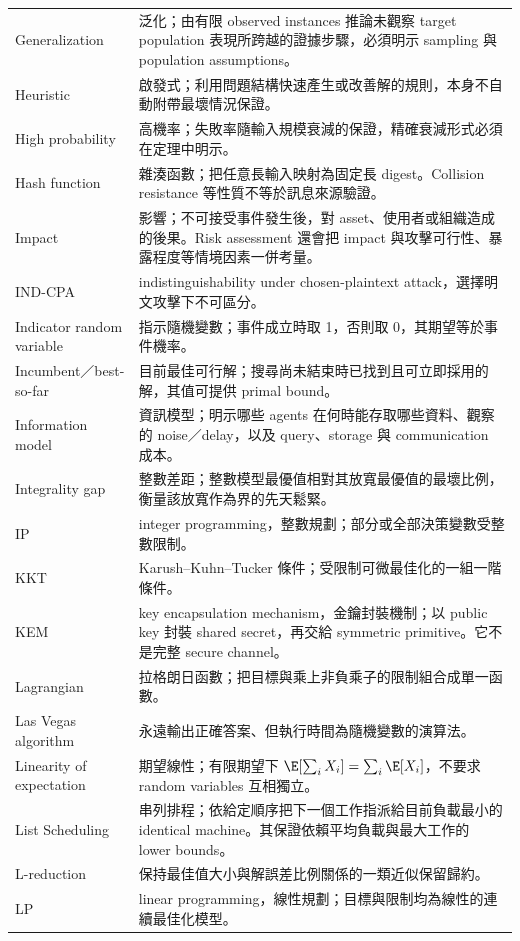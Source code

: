 \documentclass[11pt,a4paper,oneside,openany]{book}
\begin{document}
\begin{longtable}{@{}>{\raggedright\arraybackslash}p{}p{}@{}}
Generalization & 泛化；由有限 observed instances 推論未觀察 target population 表現所跨越的證據步驟，必須明示 sampling 與 population assumptions。 \\
Heuristic & 啟發式；利用問題結構快速產生或改善解的規則，本身不自動附帶最壞情況保證。 \\
High probability & 高機率；失敗率隨輸入規模衰減的保證，精確衰減形式必須在定理中明示。 \\
Hash function & 雜湊函數；把任意長輸入映射為固定長 digest。Collision resistance 等性質不等於訊息來源驗證。 \\
Impact & 影響；不可接受事件發生後，對 asset、使用者或組織造成的後果。Risk assessment 還會把 impact 與攻擊可行性、暴露程度等情境因素一併考量。 \\
IND-CPA & indistinguishability under chosen-plaintext attack，選擇明文攻擊下不可區分。 \\
Indicator random variable & 指示隨機變數；事件成立時取 1，否則取 0，其期望等於事件機率。 \\
Incumbent／best-so-far & 目前最佳可行解；搜尋尚未結束時已找到且可立即採用的解，其值可提供 primal bound。 \\
Information model & 資訊模型；明示哪些 agents 在何時能存取哪些資料、觀察的 noise／delay，以及 query、storage 與 communication 成本。 \\
Integrality gap & 整數差距；整數模型最優值相對其放寬最優值的最壞比例，衡量該放寬作為界的先天鬆緊。 \\
IP & integer programming，整數規劃；部分或全部決策變數受整數限制。 \\
KKT & Karush--Kuhn--Tucker 條件；受限制可微最佳化的一組一階條件。 \\
KEM & key encapsulation mechanism，金鑰封裝機制；以 public key 封裝 shared secret，再交給 symmetric primitive。它不是完整 secure channel。 \\
Lagrangian & 拉格朗日函數；把目標與乘上非負乘子的限制組合成單一函數。 \\
Las Vegas algorithm & 永遠輸出正確答案、但執行時間為隨機變數的演算法。 \\
Linearity of expectation & 期望線性；有限期望下 $\E[\sum_iX_i]=\sum_i\E[X_i]$，不要求 random variables 互相獨立。 \\
List Scheduling & 串列排程；依給定順序把下一個工作指派給目前負載最小的 identical machine。其保證依賴平均負載與最大工作的 lower bounds。 \\
L-reduction & 保持最佳值大小與解誤差比例關係的一類近似保留歸約。 \\
LP & linear programming，線性規劃；目標與限制均為線性的連續最佳化模型。 \\

\end{longtable}
\end{document}
